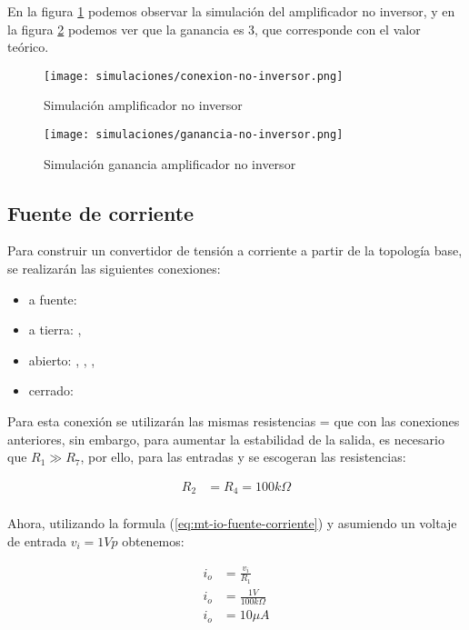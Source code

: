 En la figura \ref{fig:sim-amp-no-inversor} podemos observar la simulación del amplificador no inversor, y en la figura \ref{fig:sim-amp-no-inversor-ganancia} podemos ver que la ganancia es 3, que corresponde con el valor teórico.

\begin{figure}[ht]
    \centering
    \texttt{[image: simulaciones/conexion-no-inversor.png]}
    \caption{Simulación amplificador no inversor}
    \label{fig:sim-amp-no-inversor}
\end{figure}

\begin{figure}[ht]
    \centering
    \texttt{[image: simulaciones/ganancia-no-inversor.png]}
    \caption{Simulación ganancia amplificador no inversor}
    \label{fig:sim-amp-no-inversor-ganancia}
\end{figure}

\FloatBarrier
\subsection{Fuente de corriente}

Para construir un convertidor de tensión a corriente a partir de la topología base, se realizarán las siguientes conexiones:

\begin{itemize}
    \item a fuente: 
    \item a tierra: , 
    \item abierto: , , , 
    \item cerrado: 
\end{itemize}

Para esta conexión se utilizarán las mismas resistencias  =  que con las conexiones anteriores, sin embargo, para aumentar la estabilidad de la salida, es necesario que $R_1 \gg R_7$, por ello, para las entradas  y  se escogeran las resistencias:

\begin{align*}
    R_2 &= R_4 = 100k\Omega \\
\end{align*}

Ahora, utilizando la formula (\ref{eq:mt-io-fuente-corriente}) y asumiendo un voltaje de entrada $v_i = 1Vp$ obtenemos:

\begin{align*}
    i_o &= \frac{v_i}{R_1}  \\
    i_o &= \frac{1V}{100k\Omega}  \\
    i_o & = 10\mu A
\end{align*}

